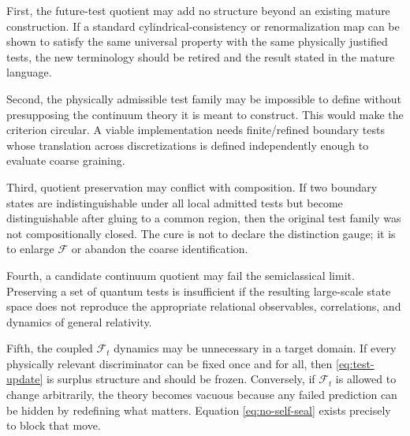 \documentclass[11pt]{article}
\newcommand{\F}{\mathcal F}
\begin{document}
First, the future-test quotient may add no structure beyond an existing mature construction. If a standard cylindrical-consistency or renormalization map can be shown to satisfy the same universal property with the same physically justified tests, the new terminology should be retired and the result stated in the mature language.

Second, the physically admissible test family may be impossible to define without presupposing the continuum theory it is meant to construct. This would make the criterion circular. A viable implementation needs finite/refined boundary tests whose translation across discretizations is defined independently enough to evaluate coarse graining.

Third, quotient preservation may conflict with composition. If two boundary states are indistinguishable under all local admitted tests but become distinguishable after gluing to a common region, then the original test family was not compositionally closed. The cure is not to declare the distinction gauge; it is to enlarge $\F$ or abandon the coarse identification.

Fourth, a candidate continuum quotient may fail the semiclassical limit. Preserving a set of quantum tests is insufficient if the resulting large-scale state space does not reproduce the appropriate relational observables, correlations, and dynamics of general relativity.

Fifth, the coupled $\F_t$ dynamics may be unnecessary in a target domain. If every physically relevant discriminator can be fixed once and for all, then \eqref{eq:test-update} is surplus structure and should be frozen. Conversely, if $\F_t$ is allowed to change arbitrarily, the theory becomes vacuous because any failed prediction can be hidden by redefining what matters. Equation \eqref{eq:no-self-seal} exists precisely to block that move.
\end{document}

